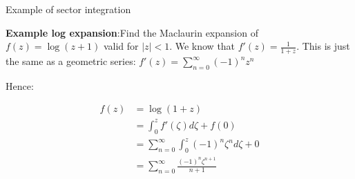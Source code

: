 \documentclass{article}
\theoremstyle{definition}
\begin{document}
\begin{multicols}{3}
Example of sector integration

\textbf{Example log expansion}:Find the Maclaurin expansion of $f(z) = \log(z+1)$ valid for $|z|<1$. We know that $f'(z) = \frac{1}{1+z}$. This is just the same as a geometric series: $f'(z) = \sum_{n=0}^\infty (-1)^n z^n$

Hence:

\begin{align}
f(z) &= \log(1+z) \\ 
& = \int_{0}^z f'(\zeta) d\zeta + f(0) \\ 
& = \sum_{n=0}^\infty \int_{0}^z (-1)^n\zeta^n d\zeta + 0 \\ 
&  = \sum_{n=0}^\infty \frac{(-1)^n\zeta^{n+1}}{n+1}  
\end{align}

\end{multicols}
\end{document}
